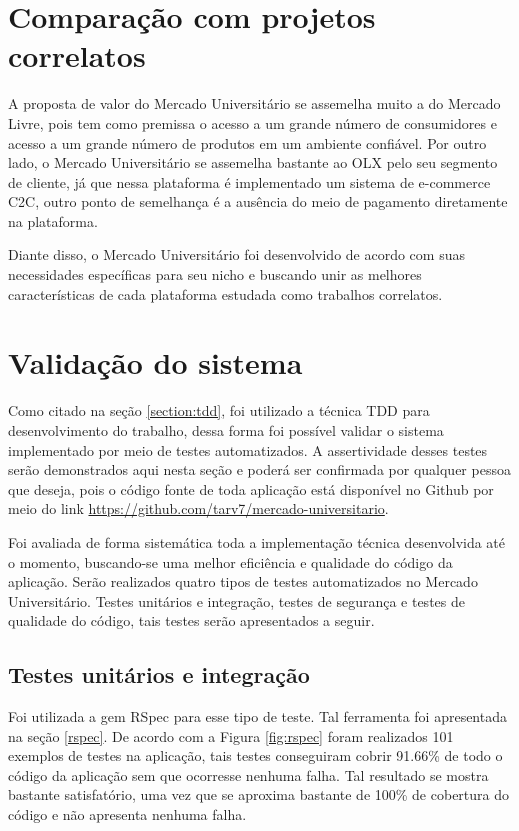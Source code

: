 \clearpage
\section{Comparação com projetos correlatos}

A proposta de valor do Mercado Universitário se assemelha muito a do Mercado Livre, pois tem como premissa o acesso a um grande número de consumidores e acesso a um grande número de produtos em um ambiente confiável. Por outro lado, o Mercado Universitário se assemelha bastante ao OLX pelo seu segmento de cliente, já que nessa plataforma é implementado um sistema de e-commerce C2C, outro ponto de semelhança é a ausência do meio de pagamento diretamente na plataforma.

Diante disso, o Mercado Universitário foi desenvolvido de acordo com suas necessidades específicas para seu nicho e buscando unir as melhores características de cada plataforma estudada como trabalhos correlatos.

\section{Validação do sistema}

Como citado na seção \ref{section:tdd}, foi utilizado a técnica TDD para desenvolvimento do trabalho, dessa forma foi possível validar o sistema implementado por meio de testes automatizados. A assertividade desses testes serão demonstrados aqui nesta seção e poderá ser confirmada por qualquer pessoa que deseja, pois o código fonte de toda aplicação está disponível no Github por meio do link \url{https://github.com/tarv7/mercado-universitario}.

Foi avaliada de forma sistemática toda a implementação técnica desenvolvida até o momento, buscando-se uma melhor eficiência e qualidade do código da aplicação. Serão realizados quatro tipos de testes automatizados no Mercado Universitário. Testes unitários e integração, testes de segurança e testes de qualidade do código, tais testes serão apresentados a seguir.

\subsection{Testes unitários e integração}

Foi utilizada a gem RSpec para esse tipo de teste. Tal ferramenta foi apresentada na seção \ref{rspec}. De acordo com a Figura \ref{fig:rspec} foram realizados 101 exemplos de testes na aplicação, tais testes conseguiram cobrir 91.66\% de todo o código da   aplicação sem que ocorresse nenhuma falha. Tal resultado se mostra bastante satisfatório, uma vez que se aproxima bastante de 100\% de cobertura do código e não apresenta nenhuma falha.

